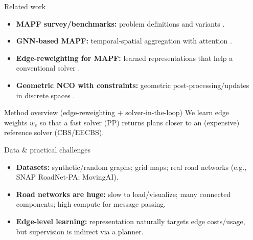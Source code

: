 \documentclass[final]{beamer}
\newlength{\sepwidth}
\newlength{\colwidth}
\newcommand{\separatorcolumn}{\begin{column}{\sepwidth}\end{column}}
\begin{document}
\begin{frame}[t]
\begin{columns}[t]
\begin{column}{\colwidth}
  \begin{block}{Related work}
    \begin{itemize}
      \item \textbf{MAPF survey/benchmarks:} problem definitions and variants \cite{stern2019mapf}.
      \item \textbf{GNN-based MAPF:} temporal-spatial aggregation with attention \cite{zhang2025gatmapf}.
      \item \textbf{Edge-reweighting for MAPF:} learned representations that help a conventional solver \cite{captar2025learned}.
      \item \textbf{Geometric NCO with constraints:} geometric post-processing/updates in discrete spaces \cite{karalias2025geometric}.
    \end{itemize}
  \end{block}

 \begin{block}{Method overview (edge-reweighting + solver-in-the-loop)}
    We learn edge weights $w_e$ so that a fast solver (PP) returns plans closer to an (expensive) reference solver (CBS/EECBS).

    \vspace{0.4em}
    
 \end{block}

\begin{block}{Data \& practical challenges}
  \begin{itemize}
    \item \textbf{Datasets:} synthetic/random graphs; grid maps; real road networks (e.g., SNAP RoadNet-PA; MovingAI).
    \item \textbf{Road networks are huge:} slow to load/visualize; many connected components; high compute for message passing.
    \item \textbf{Edge-level learning:} representation naturally targets edge costs/usage, but supervision is indirect via a planner.
  \end{itemize}
\end{block}

\end{column}

\separatorcolumn


\end{columns}
\end{frame}
\end{document}
